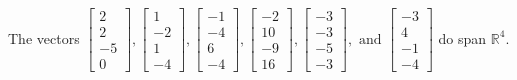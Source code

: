\begin{exercise}
\begin{exerciseStatement}
  \end{exerciseStatement}
  \begin{exerciseAnswer}
   The vectors \(\left[\begin{array}{r}
2 \\
2 \\
-5 \\
0
\end{array}\right] , \left[\begin{array}{r}
1 \\
-2 \\
1 \\
-4
\end{array}\right] , \left[\begin{array}{r}
-1 \\
-4 \\
6 \\
-4
\end{array}\right] , \left[\begin{array}{r}
-2 \\
10 \\
-9 \\
16
\end{array}\right] , \left[\begin{array}{r}
-3 \\
-3 \\
-5 \\
-3
\end{array}\right] , \text{ and } \left[\begin{array}{r}
-3 \\
4 \\
-1 \\
-4
\end{array}\right]\) 
  	 do  
	span \(\mathbb{R}^4\).
  


  \end{exerciseAnswer}
\end{exercise}